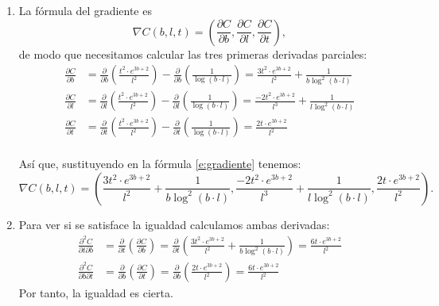 {
\begin{enumerate}
  \item La fórmula del gradiente es
\begin{equation}
\label{e:gradiente}
\nabla C(b,l,t)=\left(\frac{\partial C}{\partial b}, \frac{\partial C}{\partial l},\frac{\partial C}{\partial t}\right),
\end{equation}
de modo que necesitamos calcular las tres primeras derivadas parciales:
\begin{align*}
\frac{\partial C}{\partial b} &= \frac{\partial}{\partial b}\left(\frac{{t^2
\cdot e^{3b + 2} }}{{l^2 }}\right)-\frac{\partial}{\partial b}\left(\frac{1}{{\log
(b \cdot l)}}\right)= \frac{{3t^2 \cdot e^{3b + 2} }}{{l^2 }}+\frac{1}{{b\log^2
(b \cdot l)}}\\
\frac{\partial C}{\partial l} &= \frac{\partial}{\partial l}\left(\frac{{t^2
\cdot e^{3b + 2} }}{{l^2 }}\right)-\frac{\partial}{\partial l}\left(\frac{1}{{\log
(b \cdot l)}}\right)= \frac{{-2t^2 \cdot e^{3b + 2} }}{{l^3 }}+\frac{1}{{l\log^2
(b \cdot l)}}\\
\frac{\partial C}{\partial t} &= \frac{\partial}{\partial t}\left(\frac{{t^2
\cdot e^{3b + 2} }}{{l^2 }}\right)-\frac{\partial}{\partial t}\left(\frac{1}{{\log
(b \cdot l)}}\right)= \frac{{2t \cdot e^{3b + 2} }}{{l^2 }}\\
\end{align*}

Así que, sustituyendo en la fórmula \ref{e:gradiente} tenemos:
\[
\nabla C(b,l,t)=\left( \frac{{3t^2 \cdot e^{3b + 2} }}{{l^2 }}+\frac{1}{{b\log^2
(b \cdot l)}}, \frac{{-2t^2 \cdot e^{3b + 2} }}{{l^3 }}+\frac{1}{{l\log^2
(b \cdot l)}}, \frac{{2t \cdot e^{3b + 2} }}{{l^2 }} \right).
\]

\item Para ver si se satisface la igualdad calculamos ambas derivadas:
\begin{align*}
\frac{\partial ^2 C}{\partial t \partial b} & = \frac{\partial}{\partial
t}\left(\frac{\partial C}{\partial b}\right) = \frac{\partial}{\partial t}\left(
\frac{{3t^2 \cdot e^{3b + 2} }}{{l^2 }}+\frac{1}{{b\log^2
(b \cdot l)}} \right) = \frac{{6t \cdot e^{3b + 2} }}{{l^2 }} \\
\frac{\partial ^2 C}{\partial b \partial t} & = \frac{\partial}{\partial
b}\left(\frac{\partial C}{\partial t}\right) = \frac{\partial}{\partial b}\left(
\frac{{2t \cdot e^{3b + 2} }}{{l^2 }}\right) = \frac{{6t \cdot e^{3b + 2} }}{{l^2 }}
\end{align*}
Por tanto, la igualdad es cierta.
\end{enumerate}
}


